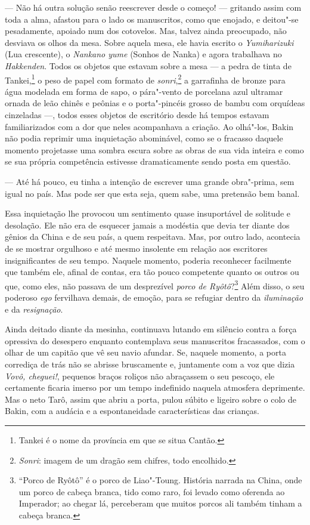--- Não há outra solução senão reescrever desde o começo! --- gritando assim
com toda a alma, afastou para o lado os manuscritos, como que enojado,
e deitou"-se pesadamente, apoiado num dos cotovelos. Mas, talvez ainda
preocupado, não desviava os olhos da mesa. Sobre aquela mesa, ele havia
escrito o \textit{Yumiharizuki} (Lua crescente), o \textit{Nankano
yume} (Sonhos de Nanka) e agora trabalhava no \textit{Hakkenden}. Todos
os objetos que estavam sobre a mesa --- a pedra de tinta de
Tankei,\footnote{ Tankei é o nome da província em que se situa Cantão.} o
peso de papel com formato de \textit{sonri},\footnote{ \textit{Sonri}: 
imagem de um dragão sem chifres, todo
encolhido.} a garrafinha de bronze para água modelada em forma de
sapo, o pára"-vento de porcelana azul ultramar ornada de leão chinês e
peônias e o porta"-pincéis grosso de bambu com orquídeas cinzeladas ---,
todos esses objetos de escritório desde há tempos estavam
familiarizados com a dor que neles acompanhava a criação. Ao olhá"-los,
Bakin não podia reprimir uma inquietação abominável, como se o fracasso
daquele momento projetasse uma sombra escura sobre as obras de sua vida
inteira e como se sua própria competência estivesse dramaticamente
sendo posta em questão.

--- Até há pouco, eu tinha a intenção de escrever uma grande obra"-prima,
sem igual no país. Mas pode ser que esta seja, quem sabe, uma pretensão
bem banal.

Essa inquietação lhe provocou um sentimento quase insuportável de
solitude e desolação. Ele não era de esquecer jamais a modéstia\textit{
}que devia ter diante dos gênios da China e de seu país, a quem
respeitava. Mas, por outro lado, acontecia de se mostrar orgulhoso e
até mesmo insolente em relação aos escritores insignificantes de seu
tempo. Naquele momento, poderia reconhecer facilmente que também ele,
afinal de contas, era tão pouco competente quanto os outros ou que,
como eles, não passava de um desprezível \textit{porco de Ryôtô}?\footnote{ ``Porco de Ryôtô'' é o porco de Liao"-Toung. História narrada na China, onde
um porco de cabeça branca, tido como raro, foi levado como oferenda ao
Imperador; ao chegar lá, perceberam que muitos porcos ali também tinham
a cabeça branca.} Além disso, o seu poderoso \textit{ego} fervilhava demais,
de emoção, para se refugiar dentro da \textit{iluminação} e da \textit{resignação}.

Ainda deitado diante da mesinha, continuava lutando em silêncio contra a
força opressiva do desespero enquanto contemplava seus manuscritos
fracassados, com o olhar de um capitão que vê seu navio afundar. Se,
naquele momento, a porta corrediça de trás não se abrisse bruscamente
e, juntamente com a voz que dizia \textit{Vovô, cheguei!}, pequenos braços
roliços não abraçassem o seu pescoço, ele certamente ficaria imerso por
um tempo indefinido naquela atmosfera deprimente. Mas o neto Tarô,
assim que abriu a porta, pulou súbito e ligeiro sobre o colo de Bakin,
com a audácia e a espontaneidade características das crianças.

